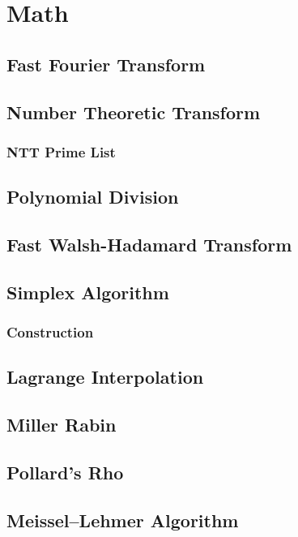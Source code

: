 \documentclass[a4paper,10pt,twocolumn,oneside]{article}
\begin{document}
\section{Math}
\subsection{Fast Fourier Transform}

\subsection{Number Theoretic Transform}

\subsubsection{NTT Prime List}

\subsection{Polynomial Division}

\subsection{Fast Walsh-Hadamard Transform}

\subsection{Simplex Algorithm}

\subsubsection{Construction}

\subsection{Lagrange Interpolation}

\subsection{Miller Rabin}

\subsection{Pollard's Rho}

\subsection{Meissel–Lehmer Algorithm}

\end{document}
